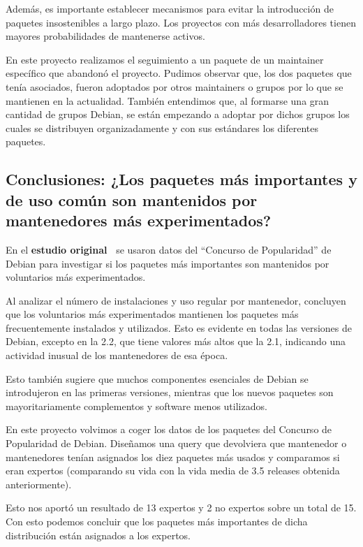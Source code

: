 \documentclass[a4paper, 12pt]{book}
\begin{document}
Además, es importante establecer mecanismos para evitar la introducción de paquetes insostenibles a largo plazo. Los proyectos con más desarrolladores tienen mayores probabilidades de mantenerse activos.

En este proyecto realizamos el seguimiento a un paquete de un maintainer específico que abandonó el proyecto. Pudimos observar que, los dos paquetes que tenía asociados, fueron adoptados por otros maintainers o grupos por lo que se mantienen en la actualidad. También entendimos que, al formarse una gran cantidad de grupos Debian, se están empezando a adoptar por dichos grupos los cuales se distribuyen organizadamente y con sus estándares los diferentes paquetes.

\subsection{Conclusiones: ¿Los paquetes más importantes y de uso común son mantenidos por mantenedores más experimentados?}
\label{subsec:conclusion_6}

En el \textbf{estudio original~\cite{robles05:_debian}} se usaron datos del ``Concurso de Popularidad'' de Debian para investigar si los paquetes más importantes son mantenidos por voluntarios más experimentados.

Al analizar el número de instalaciones y uso regular por mantenedor, concluyen que los voluntarios más experimentados mantienen los paquetes más frecuentemente instalados y utilizados. Esto es evidente en todas las versiones de Debian, excepto en la 2.2, que tiene valores más altos que la 2.1, indicando una actividad inusual de los mantenedores de esa época.

Esto también sugiere que muchos componentes esenciales de Debian se introdujeron en las primeras versiones, mientras que los nuevos paquetes son mayoritariamente complementos y software menos utilizados.

En este proyecto volvimos a coger los datos de los paquetes del Concurso de Popularidad de Debian. Diseñamos una query que devolviera que mantenedor o mantenedores tenían asignados los diez paquetes más usados y comparamos si eran expertos (comparando su vida con la vida media de 3.5 releases obtenida anteriormente).

Esto nos aportó un resultado de 13 expertos y 2 no expertos sobre un total de 15. Con esto podemos concluir que los paquetes más importantes de dicha distribución están asignados a los expertos.
\end{document}
